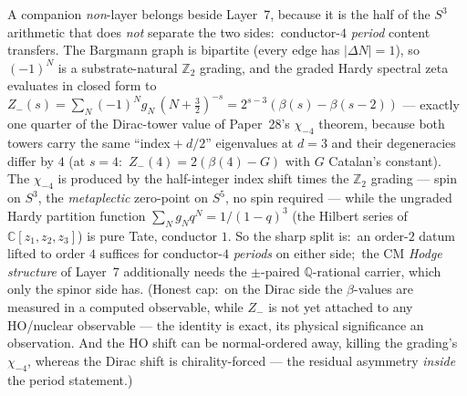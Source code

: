 \documentclass[twocolumn,pra,amsmath,amssymb,superscriptaddress]{revtex4-2}
\begin{document}
A companion \emph{non}-layer belongs beside Layer~7, because it is the half of
the $S^3$ arithmetic that does \emph{not} separate the two sides:\
conductor-$4$ \emph{period} content transfers.  The Bargmann graph is bipartite
(every edge has $|\Delta N|=1$), so $(-1)^N$ is a substrate-natural $\mathbb{Z}_2$
grading, and the graded Hardy spectral zeta evaluates in closed form to
$Z_-(s)=\sum_N(-1)^N g_N\,(N+\tfrac32)^{-s}=2^{s-3}\!\left(\beta(s)-
\beta(s-2)\right)$ --- exactly one quarter of the Dirac-tower value of
Paper~28's $\chi_{-4}$ theorem, because both towers carry the same
``index${}+d/2$'' eigenvalues at $d=3$ and their degeneracies differ by $4$
(at $s=4$:\ $Z_-(4)=2(\beta(4)-G)$ with $G$ Catalan's constant).  The
$\chi_{-4}$ is produced by the half-integer index shift times the $\mathbb{Z}_2$
grading --- spin on $S^3$, the \emph{metaplectic} zero-point on $S^5$, no spin
required --- while the ungraded Hardy partition function
$\sum_N g_N q^N=1/(1-q)^3$ (the Hilbert series of $\mathbb{C}[z_1,z_2,z_3]$) is pure
Tate, conductor $1$.  So the sharp split is:\ an order-$2$ datum lifted to
order $4$ suffices for conductor-$4$ \emph{periods} on either side;\ the CM
\emph{Hodge structure} of Layer~7 additionally needs the $\pm$-paired
$\mathbb{Q}$-rational carrier, which only the spinor side has.  (Honest cap:\ on the
Dirac side the $\beta$-values are measured in a computed observable, while
$Z_-$ is not yet attached to any HO/nuclear observable --- the identity is
exact, its physical significance an observation.  And the HO shift can be
normal-ordered away, killing the grading's $\chi_{-4}$, whereas the Dirac
shift is chirality-forced --- the residual asymmetry \emph{inside} the
period statement.)
\end{document}
